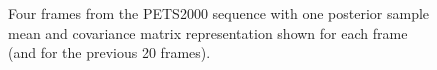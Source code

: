 \documentclass[twocolumn, final]{svjour3}
\begin{document}
\begin{figure}[h]
  \centering             
   \hspace{1pt}
   \hspace{1pt}
   \hspace{1pt}
  \caption{Four frames from the PETS2000 sequence with one posterior sample mean and covariance matrix representation shown for each frame (and for the previous 20 frames).}
  \label{fig:pets2001_imgs}
\end{figure}
\end{document}
